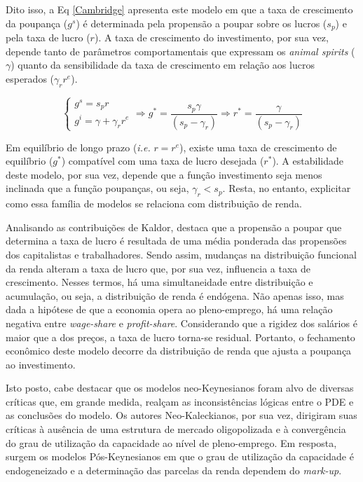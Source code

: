 Dito isso, a Eq \ref{Cambridge} apresenta este modelo em que a taxa de crescimento da poupança ($g^s$) é determinada pela propensão a poupar sobre os lucros ($s_p$) e pela taxa de lucro ($r$). A taxa de crescimento do investimento, por sua vez, depende tanto de parâmetros comportamentais que expressam os \textit{animal spirits} ($\gamma$) quanto da sensibilidade  da taxa de crescimento em relação aos lucros esperados ($\gamma_rr^e$).

\begin{equation}
\label{Cambridge}
\begin{cases}
g^s = s_pr\\
g^i = \gamma + \gamma_rr^e
\end{cases} \Rightarrow g^* = \frac{s_p\gamma}{(s_p-\gamma_r)} \Rightarrow r^* = \frac{\gamma}{(s_p - \gamma_r)}
\end{equation}

Em equilíbrio de longo prazo (\textit{i.e.} $r = r^e$), existe uma taxa de crescimento de equilíbrio ($g^*$) compatível com uma taxa de lucro desejada ($r^*$). A estabilidade deste modelo, por sua vez, depende que a função investimento seja menos inclinada que a função poupanças, ou seja, $\gamma_r < s_p$. Resta, no entanto, explicitar como essa família de modelos se relaciona com distribuição de renda.

Analisando as contribuições de Kaldor, \textcite{hein_distribution_2014} destaca que a propensão a poupar que determina a taxa de lucro é resultada de uma média ponderada das propensões dos capitalistas e trabalhadores. Sendo assim, mudanças na distribuição funcional da renda alteram a taxa de lucro que, por sua vez, influencia a taxa de crescimento. Nesses termos, há uma simultaneidade entre distribuição e acumulação, ou seja, a distribuição de renda é endógena. Não apenas isso, mas dada a hipótese de que a economia opera ao pleno-emprego, há uma relação negativa entre \textit{wage-share} e \textit{profit-share}. Considerando que a rigidez dos salários é maior que a dos preços, a taxa de lucro torna-se residual. Portanto, o fechamento econômico deste modelo decorre da distribuição de renda que ajusta a poupança ao investimento. 


Isto posto, cabe destacar que os modelos neo-Keynesianos foram alvo de diversas críticas que, em grande medida, realçam as inconsistências lógicas entre o PDE e as conclusões do modelo. Os autores Neo-Kaleckianos, por sua vez, dirigiram suas críticas à ausência de uma estrutura de mercado oligopolizada e à convergência do grau de utilização da capacidade ao nível de pleno-emprego. Em resposta, surgem os modelos Pós-Keynesianos em que o grau de utilização da capacidade é endogeneizado e a determinação das parcelas da renda dependem do \textit{mark-up}.

